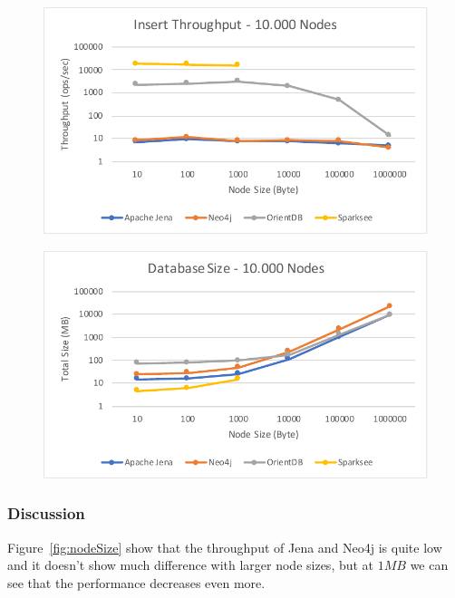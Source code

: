 \begin{figure}[h!]
  \begin{minipage}{.5\textwidth}
    \centering
    \includegraphics[width=\textwidth]{images/throughput/nodeSize}
    \label{fig:nodeSize}
  \end{minipage}
  \begin{minipage}{.5\textwidth}
    \centering
    \includegraphics[width=\textwidth]{images/throughput/sizeDatabaseSize}
    \label{fig:sizeDatabaseSize}
  \end{minipage}
\end{figure}

\subsubsection{Discussion}
Figure~\ref{fig:nodeSize} show that the throughput of Jena and Neo4j is quite low and it doesn't show much difference with larger node sizes,
but at $ 1MB $ we can see that the performance decreases even more.

